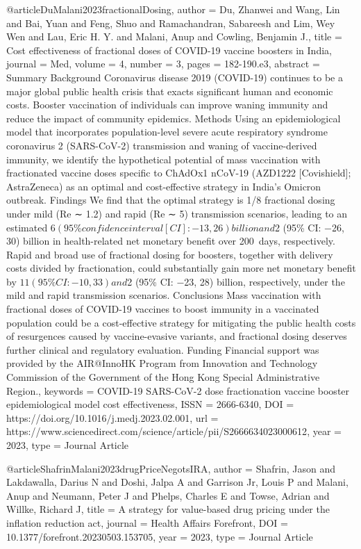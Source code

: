 {{@article{DuMalani2023fractionalDosing,
   author = {Du, Zhanwei and Wang, Lin and Bai, Yuan and Feng, Shuo and Ramachandran, Sabareesh and Lim, Wey Wen and Lau, Eric H. Y. and Malani, Anup and Cowling, Benjamin J.},
   title = {Cost effectiveness of fractional doses of COVID-19 vaccine boosters in India},
   journal = {Med},
   volume = {4},
   number = {3},
   pages = {182-190.e3},
   abstract = {Summary Background Coronavirus disease 2019 (COVID-19) continues to be a major global public health crisis that exacts significant human and economic costs. Booster vaccination of individuals can improve waning immunity and reduce the impact of community epidemics. Methods Using an epidemiological model that incorporates population-level severe acute respiratory syndrome coronavirus 2 (SARS-CoV-2) transmission and waning of vaccine-derived immunity, we identify the hypothetical potential of mass vaccination with fractionated vaccine doses specific to ChAdOx1 nCoV-19 (AZD1222 [Covishield]; AstraZeneca) as an optimal and cost-effective strategy in India’s Omicron outbreak. Findings We find that the optimal strategy is 1/8 fractional dosing under mild (Re ∼ 1.2) and rapid (Re ∼ 5) transmission scenarios, leading to an estimated $6 (95\% confidence interval [CI]: −13, 26) billion and $2 (95\% CI: −26, 30) billion in health-related net monetary benefit over 200 days, respectively. Rapid and broad use of fractional dosing for boosters, together with delivery costs divided by fractionation, could substantially gain more net monetary benefit by $11 (95\% CI: −10, 33) and $2 (95\% CI: −23, 28) billion, respectively, under the mild and rapid transmission scenarios. Conclusions Mass vaccination with fractional doses of COVID-19 vaccines to boost immunity in a vaccinated population could be a cost-effective strategy for mitigating the public health costs of resurgences caused by vaccine-evasive variants, and fractional dosing deserves further clinical and regulatory evaluation. Funding Financial support was provided by the AIR@InnoHK Program from Innovation and Technology Commission of the Government of the Hong Kong Special Administrative Region.},
   keywords = {COVID-19
SARS-CoV-2
dose fractionation
vaccine booster
epidemiological model
cost effectiveness},
   ISSN = {2666-6340},
   DOI = {https://doi.org/10.1016/j.medj.2023.02.001},
   url = {https://www.sciencedirect.com/science/article/pii/S2666634023000612},
   year = {2023},
   type = {Journal Article}
}

@article{ShafrinMalani2023drugPriceNegotsIRA,
   author = {Shafrin, Jason and Lakdawalla, Darius N and Doshi, Jalpa A and Garrison Jr, Louis P and Malani, Anup and Neumann, Peter J and Phelps, Charles E and Towse, Adrian and Willke, Richard J},
   title = {A strategy for value-based drug pricing under the inflation reduction act},
   journal = {Health Affairs Forefront},
   DOI = {10.1377/forefront.20230503.153705},
   year = {2023},
   type = {Journal Article}
}

}}
